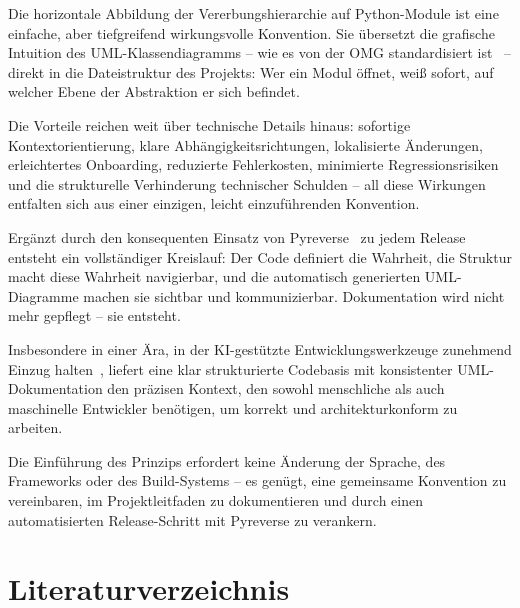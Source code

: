 ﻿\documentclass[a4paper,12pt]{article}
\begin{document}
Die horizontale Abbildung der Vererbungshierarchie auf Python-Module ist eine
einfache, aber tiefgreifend wirkungsvolle Konvention. Sie übersetzt die grafische
Intuition des UML-Klassendiagramms -- wie es von der OMG standardisiert
ist~\cite{omg2017} -- direkt in die Dateistruktur des Projekts: Wer ein Modul
öffnet, weiß sofort, auf welcher Ebene der Abstraktion er sich befindet.

Die Vorteile reichen weit über technische Details hinaus: sofortige
Kontextorientierung, klare Abhängigkeitsrichtungen, lokalisierte Änderungen,
erleichtertes Onboarding, reduzierte Fehlerkosten, minimierte Regressionsrisiken
und die strukturelle Verhinderung technischer Schulden -- all diese Wirkungen
entfalten sich aus einer einzigen, leicht einzuführenden Konvention.

Ergänzt durch den konsequenten Einsatz von Pyreverse~\cite{pyreverse2024} zu
jedem Release entsteht ein vollständiger Kreislauf: Der Code definiert die
Wahrheit, die Struktur macht diese Wahrheit navigierbar, und die automatisch
generierten UML-Diagramme machen sie sichtbar und kommunizierbar. Dokumentation
wird nicht mehr gepflegt -- sie entsteht.

Insbesondere in einer Ära, in der KI-gestützte Entwicklungswerkzeuge zunehmend
Einzug halten~\cite{chen2021}, liefert eine klar strukturierte Codebasis mit
konsistenter UML-Dokumentation den präzisen Kontext, den sowohl menschliche
als auch maschinelle Entwickler benötigen, um korrekt und architekturkonform
zu arbeiten.

\vspace{1em}
\noindent Die Einführung des Prinzips erfordert keine Änderung der Sprache,
des Frameworks oder des Build-Systems -- es genügt, eine gemeinsame Konvention
zu vereinbaren, im Projektleitfaden zu dokumentieren und durch einen automatisierten
Release-Schritt mit Pyreverse zu verankern.

\newpage
\section*{Literaturverzeichnis}
\end{document}
